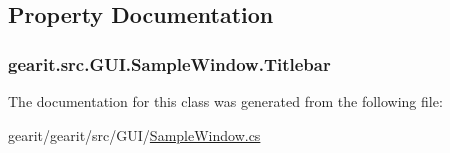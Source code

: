 \subsection{Property Documentation}
\hypertarget{classgearit_1_1src_1_1_g_u_i_1_1_sample_window_a21150fd35ee57ae518452df6a6a5d6df}{
\subsubsection[{Titlebar}]{ gearit.\+src.\+G\+U\+I.\+Sample\+Window.\+Titlebar\hspace{0.3cm}{\ttfamily [get]}}}\label{classgearit_1_1src_1_1_g_u_i_1_1_sample_window_a21150fd35ee57ae518452df6a6a5d6df}


The documentation for this class was generated from the following file\+:\begin{DoxyCompactItemize}
\item 
gearit/gearit/src/\+G\+U\+I/\hyperlink{_sample_window_8cs}{Sample\+Window.\+cs}\end{DoxyCompactItemize}
